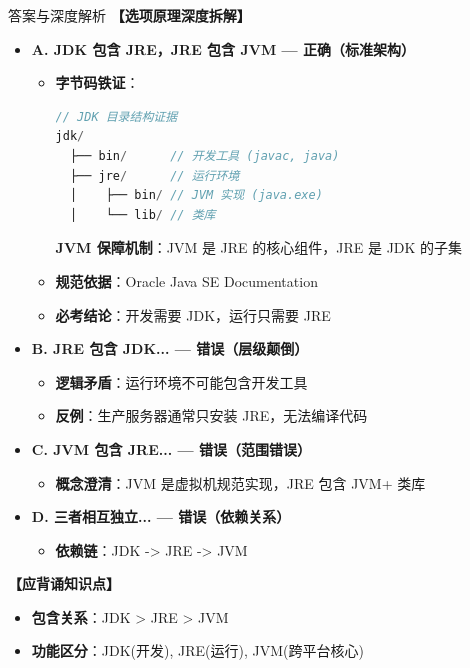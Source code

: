 ﻿\documentclass[12pt, a4paper]{ctexart}
\begin{document}
\begin{enumerate}[label=\arabic*., itemsep=1.5em]
\begin{bluebox}{答案与深度解析}
		      \textbf{【选项原理深度拆解】}
		      \begin{itemize}[leftmargin=*, nosep]
			      \item \textbf{A. JDK 包含 JRE，JRE 包含 JVM — 正确（标准架构）}
			            \begin{itemize}[leftmargin=*, nosep]
				            \item \textbf{字节码铁证}：
				                  \begin{lstlisting}[language=Java]
// JDK 目录结构证据
jdk/
  ├── bin/      // 开发工具 (javac, java)
  ├── jre/      // 运行环境
  │    ├── bin/ // JVM 实现 (java.exe)
  │    └── lib/ // 类库
                \end{lstlisting}
				                  \textbf{JVM 保障机制}：JVM 是 JRE 的核心组件，JRE 是 JDK 的子集
				            \item \textbf{规范依据}：Oracle Java SE Documentation
				            \item \textbf{必考结论}：开发需要 JDK，运行只需要 JRE
			            \end{itemize}

			      \item \textbf{B. JRE 包含 JDK... — 错误（层级颠倒）}
			            \begin{itemize}[leftmargin=*, nosep]
				            \item \textbf{逻辑矛盾}：运行环境不可能包含开发工具
				            \item \textbf{反例}：生产服务器通常只安装 JRE，无法编译代码
			            \end{itemize}

			      \item \textbf{C. JVM 包含 JRE... — 错误（范围错误）}
			            \begin{itemize}[leftmargin=*, nosep]
				            \item \textbf{概念澄清}：JVM 是虚拟机规范实现，JRE 包含 JVM+ 类库
			            \end{itemize}

			      \item \textbf{D. 三者相互独立... — 错误（依赖关系）}
			            \begin{itemize}[leftmargin=*, nosep]
				            \item \textbf{依赖链}：JDK -> JRE -> JVM
			            \end{itemize}
		      \end{itemize}

		      \textbf{【应背诵知识点】}
		      \begin{itemize}[leftmargin=*, nosep]
			      \item \textbf{包含关系}：JDK > JRE > JVM
			      \item \textbf{功能区分}：JDK(开发), JRE(运行), JVM(跨平台核心)
		      \end{itemize}


\end{bluebox}
\end{enumerate}
\end{document}
